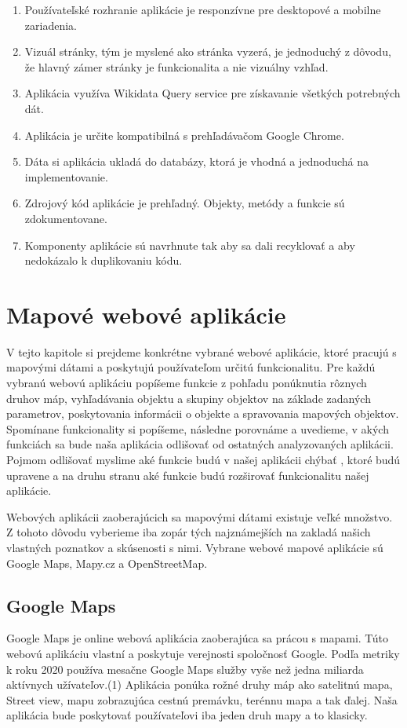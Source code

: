 \begin{enumerate}
      \item Používateľské rozhranie aplikácie je responzívne pre desktopové a mobilne zariadenia.
      \item Vizuál stránky, tým je myslené ako stránka vyzerá, je jednoduchý z dôvodu, že hlavný zámer stránky
            je funkcionalita a nie vizuálny vzhľad.
      \item Aplikácia využíva Wikidata Query service pre získavanie všetkých potrebných dát.
      \item Aplikácia je určite kompatibilná s prehľadávačom Google Chrome.
      \item Dáta si aplikácia ukladá do databázy, ktorá je vhodná a jednoduchá na implementovanie.
      \item Zdrojový kód aplikácie je prehľadný. Objekty, metódy a funkcie sú zdokumentovane.
      \item Komponenty aplikácie sú navrhnute tak aby sa dali recyklovať a aby nedokázalo k duplikovaniu kódu.
\end{enumerate}


\chapter{Mapové webové aplikácie}
V tejto kapitole si prejdeme konkrétne vybrané webové aplikácie, ktoré pracujú s mapovými dátami a poskytujú používateľom určitú funkcionalitu. Pre každú vybranú webovú aplikáciu popíšeme 
funkcie z pohľadu ponúknutia rôznych druhov máp, vyhľadávania objektu a skupiny objektov na základe zadaných parametrov, 
poskytovania informácii o objekte a spravovania mapových objektov. 
Spomínane funkcionality si popíšeme, následne porovnáme a uvedieme, v akých funkciách sa bude naša aplikácia odlišovať od ostatných analyzovaných 
aplikácii. Pojmom odlišovať myslime aké funkcie budú v našej aplikácii chýbať , ktoré budú upravene a na druhu 
stranu aké funkcie budú rozširovať funkcionalitu našej aplikácie. 

Webových aplikácii zaoberajúcich sa mapovými dátami existuje veľké množstvo.
Z tohoto dôvodu vyberieme iba zopár tých najznámejších na zakladá našich vlastných 
poznatkov a skúsenosti s nimi. 
Vybrane webové mapové aplikácie sú Google Maps, Mapy.cz a OpenStreetMap. 

\section{Google Maps}
Google Maps je online webová aplikácia zaoberajúca sa prácou s mapami. Túto webovú aplikáciu vlastní a poskytuje verejnosti spoločnosť Google. 
Podľa metriky k roku 2020 používa mesačne Google Maps služby vyše než jedna miliarda aktívnych užívateľov.(1) 
Aplikácia ponúka rožné druhy máp ako satelitnú mapa, Street view, mapu zobrazujúca cestnú premávku, terénnu mapa a tak ďalej.
Naša aplikácia bude poskytovať používateľovi iba jeden druh mapy a to klasicky. 

